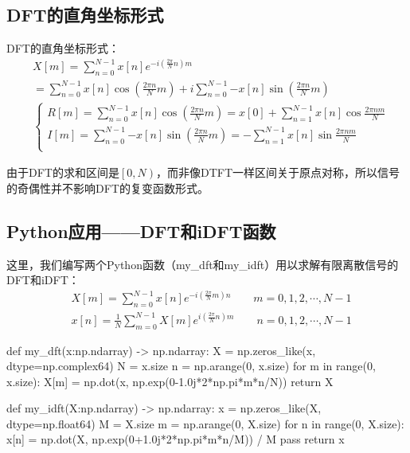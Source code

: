 \subsection{DFT的直角坐标形式}

DFT的直角坐标形式：
\begin{align*}
&X\left[ m \right] =\sum_{n=0}^{N-1}{x\left[ n \right] e^{-i\left( \frac{2\pi}{N}n \right) m}} \\
&=\sum_{n=0}^{N-1}{x\left[ n \right] \cos \left( \frac{2\pi n}{N}m \right)}+i\sum_{n=0}^{N-1}{-x\left[ n \right] \sin \left( \frac{2\pi n}{N}m \right)} \\
&\begin{cases}
	R\left[ m \right] =\sum_{n=0}^{N-1}{x\left[ n \right] \cos \left( \frac{2\pi n}{N}m \right)}=x\left[ 0 \right] +\sum_{n=1}^{N-1}{x\left[ n \right] \cos \frac{2\pi nm}{N}}\\
	I\left[ m \right] =\sum_{n=0}^{N-1}{-x\left[ n \right] \sin \left( \frac{2\pi n}{N}m \right)}=-\sum_{n=1}^{N-1}{x\left[ n \right] \sin \frac{2\pi nm}{N}}\\
\end{cases}
\end{align*}

由于DFT的求和区间是$\left[ 0,N \right) $，而非像DTFT一样区间关于原点对称，所以信号的奇偶性并不影响DFT的复变函数形式。

\subsection{Python应用——DFT和iDFT函数}

这里，我们编写两个Python函数（my\_dft和my\_idft）用以求解有限离散信号的DFT和iDFT：
\begin{align*}
&X\left[ m \right] =\sum_{n=0}^{N-1}{x\left[ n \right] e^{-i\left( \frac{2\pi}{N}m \right) n}} \qquad m=0,1,2,\cdots ,N-1 \\
&x\left[ n \right] =\frac{1}{N}\sum_{m=0}^{N-1}{X\left[ m \right] e^{i\left( \frac{2\pi}{N}n \right) m}} \qquad n=0,1,2,\cdots ,N-1
\end{align*}

\begin{python}
def my_dft(x:np.ndarray) -> np.ndarray:
    X = np.zeros_like(x, dtype=np.complex64)
    N = x.size
    n = np.arange(0, x.size)
    for m in range(0, x.size):
        X[m] = np.dot(x, np.exp(0-1.0j*2*np.pi*m*n/N))
    return X

def my_idft(X:np.ndarray) -> np.ndarray:
    x = np.zeros_like(X, dtype=np.float64)
    M = X.size
    m = np.arange(0, X.size)
    for n in range(0, X.size):
        x[n] = np.dot(X, np.exp(0+1.0j*2*np.pi*m*n/M)) / M
        pass
    return x
\end{python}

